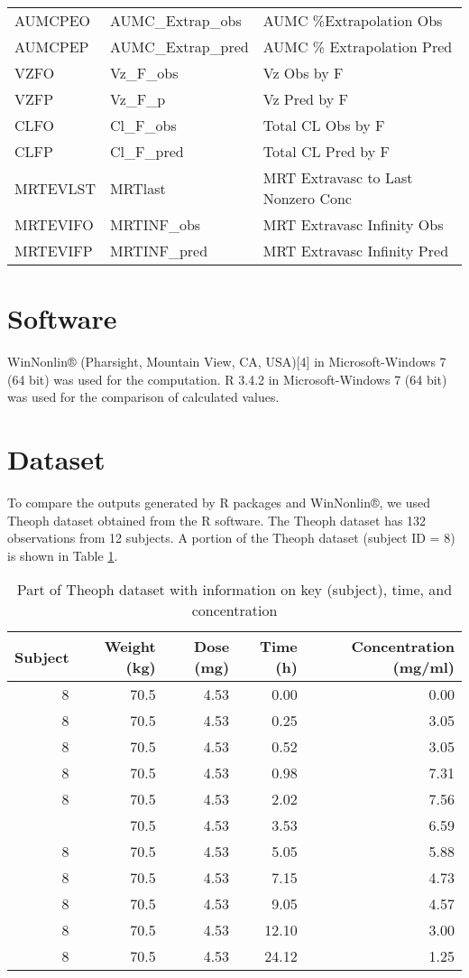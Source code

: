 \documentclass[12pt,]{krantz}
\theoremstyle{definition}
\theoremstyle{definition}
\theoremstyle{definition}
\theoremstyle{remark}
\begin{document}
\begin{longtable}[t]{lll}
AUMCPEO & AUMC\_Extrap\_obs & AUMC \%Extrapolation Obs\\
AUMCPEP & AUMC\_Extrap\_pred & AUMC \% Extrapolation Pred\\
VZFO & Vz\_F\_obs & Vz Obs by F\\
\addlinespace
VZFP & Vz\_F\_p & Vz Pred by F\\
CLFO & Cl\_F\_obs & Total CL Obs by F\\
CLFP & Cl\_F\_pred & Total CL Pred by F\\
MRTEVLST & MRTlast & MRT Extravasc to Last Nonzero Conc\\
MRTEVIFO & MRTINF\_obs & MRT Extravasc Infinity Obs\\
MRTEVIFP & MRTINF\_pred & MRT Extravasc Infinity Pred\\
\bottomrule
\end{longtable}

\section{Software}\label{software}

WinNonlin® (Pharsight, Mountain View, CA, USA){[}4{]} in
Microsoft-Windows 7 (64 bit) was used for the computation. R 3.4.2 in
Microsoft-Windows 7 (64 bit) was used for the comparison of calculated
values.

\section{Dataset}\label{dataset}

To compare the outputs generated by R packages and WinNonlin®, we used
Theoph dataset obtained from the R software. The Theoph dataset has 132
observations from 12 subjects. A portion of the Theoph dataset (subject
ID = 8) is shown in Table \ref{tab:table2}.

\begin{table}

\caption{\label{tab:table2}Part of Theoph dataset with information on key (subject), time, and concentration}
\centering
\begin{tabular}[t]{rrrrr}
\toprule
Subject & Weight (kg) & Dose (mg) & Time (h) & Concentration (mg/ml)\\
\midrule
8 & 70.5 & 4.53 & 0.00 & 0.00\\
8 & 70.5 & 4.53 & 0.25 & 3.05\\
8 & 70.5 & 4.53 & 0.52 & 3.05\\
8 & 70.5 & 4.53 & 0.98 & 7.31\\
8 & 70.5 & 4.53 & 2.02 & 7.56\\
\addlinespace
8 & 70.5 & 4.53 & 3.53 & 6.59\\
8 & 70.5 & 4.53 & 5.05 & 5.88\\
8 & 70.5 & 4.53 & 7.15 & 4.73\\
8 & 70.5 & 4.53 & 9.05 & 4.57\\
8 & 70.5 & 4.53 & 12.10 & 3.00\\
8 & 70.5 & 4.53 & 24.12 & 1.25\\
\bottomrule
\end{tabular}
\end{table}
\end{document}
